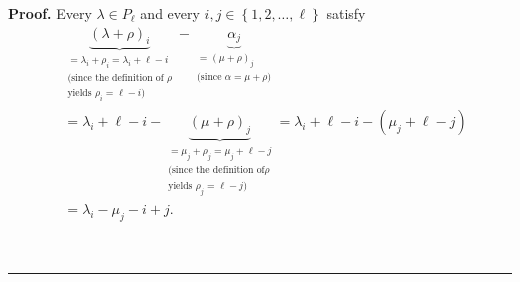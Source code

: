 \documentclass[numbers=enddot,12pt,final,onecolumn,notitlepage]{scrartcl}%
\theoremstyle{definition}
\newenvironment{proof}[1][Proof]{\noindent\textbf{#1.} }{\ \rule{0.5em}{0.5em}}
\newenvironment{verlong}{}{}
\begin{document}
\begin{verlong}
\begin{proof}
Every $\lambda\in P_{\ell}$ and every $i,j\in\left\{  1,2,\ldots,\ell\right\}
$ satisfy%
\begin{align}
&  \underbrace{\left(  \lambda+\rho\right)  _{i}}_{\substack{=\lambda_{i}%
+\rho_{i}=\lambda_{i}+\ell-i\\\text{(since the definition of }\rho
\\\text{yields }\rho_{i}=\ell-i\text{)}}}-\underbrace{\alpha_{j}%
}_{\substack{=\left(  \mu+\rho\right)  _{j}\\\text{(since }\alpha=\mu
+\rho\text{)}}}\nonumber\\
&  =\lambda_{i}+\ell-i-\underbrace{\left(  \mu+\rho\right)  _{j}%
}_{\substack{=\mu_{j}+\rho_{j}=\mu_{j}+\ell-j\\\text{(since the definition of
}\rho\\\text{yields }\rho_{j}=\ell-j\text{)}}}=\lambda_{i}+\ell-i-\left(
\mu_{j}+\ell-j\right) \nonumber\\
&  =\lambda_{i}-\mu_{j}-i+j. \label{pf.thm.G.pieri.dif}%
\end{align}



\end{proof}
\end{verlong}
\end{document}

